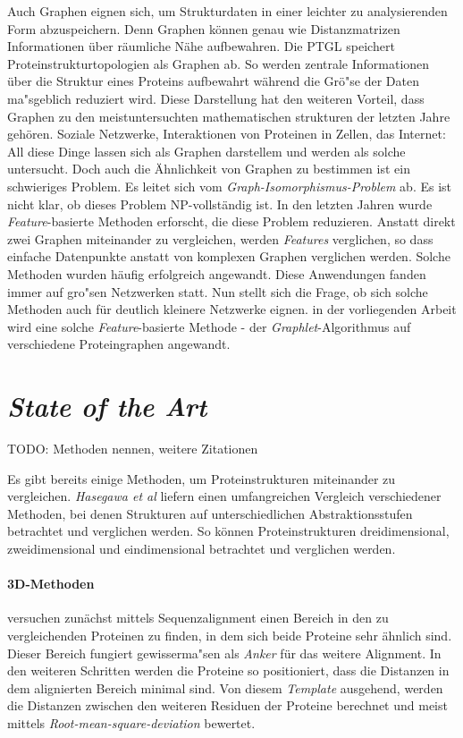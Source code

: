 \documentclass{report}
\begin{document}
Auch Graphen eignen sich, um Strukturdaten in einer leichter zu analysierenden Form abzuspeichern. Denn Graphen k\"onnen genau wie Distanzmatrizen Informationen \"uber r\"aumliche N\"ahe aufbewahren.
Die PTGL \cite{ptgl1} speichert Proteinstrukturtopologien als Graphen ab. So werden zentrale Informationen \"uber die Struktur eines Proteins aufbewahrt w\"ahrend die Gr\"o"se der Daten ma"sgeblich reduziert wird. Diese Darstellung hat den weiteren Vorteil, dass Graphen zu den meistuntersuchten mathematischen strukturen der letzten Jahre geh\"oren. Soziale Netzwerke, Interaktionen von Proteinen in Zellen, das Internet: All diese Dinge lassen sich als Graphen darstellem und werden als solche untersucht.
Doch auch die \"Ahnlichkeit von Graphen zu bestimmen ist ein schwieriges Problem. Es leitet sich vom \emph{Graph-Isomorphismus-Problem} ab. Es ist nicht klar, ob dieses Problem NP-vollst\"andig ist. In den letzten Jahren wurde \textit{Feature}-basierte Methoden erforscht, die diese Problem reduzieren. Anstatt direkt zwei Graphen miteinander zu vergleichen, werden \textit{Features} verglichen, so dass einfache Datenpunkte anstatt von komplexen Graphen verglichen werden.
Solche Methoden wurden h\"aufig erfolgreich angewandt. Diese Anwendungen fanden immer auf gro"sen Netzwerken statt. Nun stellt sich die Frage, ob sich solche Methoden auch f\"ur deutlich kleinere Netzwerke eignen. in der vorliegenden Arbeit wird eine solche \textit{Feature}-basierte Methode - der \textit{Graphlet}-Algorithmus auf verschiedene Proteingraphen angewandt. 


\section{\textit{State of the Art}}

TODO: Methoden nennen, weitere Zitationen

Es gibt bereits einige Methoden, um Proteinstrukturen miteinander zu vergleichen. \textit{Hasegawa et al} \cite{advancespitfalls} liefern einen umfangreichen Vergleich verschiedener Methoden, bei denen Strukturen auf unterschiedlichen Abstraktionsstufen betrachtet und verglichen werden. So k\"onnen Proteinstrukturen dreidimensional, zweidimensional und eindimensional betrachtet und verglichen werden.

\paragraph{3D-Methoden} versuchen zun\"achst mittels Sequenzalignment einen Bereich in den zu vergleichenden Proteinen zu finden, in dem sich beide Proteine sehr \"ahnlich sind. Dieser Bereich fungiert gewisserma"sen als \emph{Anker} f\"ur das weitere Alignment. In den weiteren Schritten werden die Proteine so positioniert, dass die Distanzen in dem alignierten Bereich minimal sind. Von diesem \textit{Template} ausgehend, werden die Distanzen zwischen den weiteren Residuen der Proteine berechnet und meist mittels \textit{Root-mean-square-deviation} bewertet.
\end{document}
